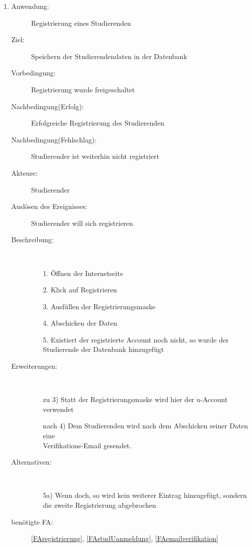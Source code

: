 \documentclass[parskip=full]{scrartcl}
\newcommand{\swtLabel}[1]{\textbf{/#1\arabic*0/}}
\begin{document}
\begin{enumerate}[label=\swtLabel{S}]
	\item
    \begin{description}
  	\item[Anwendung:] Registrierung eines Studierenden
  	\item[Ziel:] Speichern der Studierendendaten in der Datenbank
  	\item[Vorbedingung:] Registrierung wurde freigeschaltet
  	\item[Nachbedingung(Erfolg):] Erfolgreiche Registrierung des Studierenden
  	\item[Nachbedingung(Fehlschlag):] Studierender ist weiterhin nicht
  	registriert
  	\item[Akteure:] Studierender
  	\item[Auslösen des Ereignisses:] Studierender will sich registrieren
  	\item[Beschreibung:]~
  	\begin{enumerate}
  	  \item[1.] Öffnen der Internetseite
      \item[2.] Klick auf Registrieren
      \item[3.] Ausfüllen der Registrierungsmaske %
      \item[4.] Abschicken der Daten
      \item[5.] Existiert der registrierte Account noch nicht, so wurde der
      Studierende der Datenbank hinzugefügt
  	\end{enumerate}
  	\item[Erweiterungen:]~
  	\begin{enumerate}
  	  \item[zu 3)] Statt der Registrierungsmaske wird hier der u-Account
  	  verwendet
  	  \item[nach 4)] Dem Studierenden wird nach dem Abschicken seiner Daten eine
  	  \\
  	  Verifikations-Email gesendet.
  	 \end{enumerate} 
  	\item[Alternativen:]~
  	\begin{enumerate}
  	  \item[5a)] Wenn doch, so wird kein weiterer Eintrag hinzugefügt, sondern
  	  die zweite Registrierung abgebrochen
  	\end{enumerate} 
  	\item[benötigte FA:] \ref{FAregistrierung}, \ref{FAstudUanmeldung},
  	\ref{FAemailverifikation}
  \end{description}
%   
  

\end{enumerate}
\end{document}
